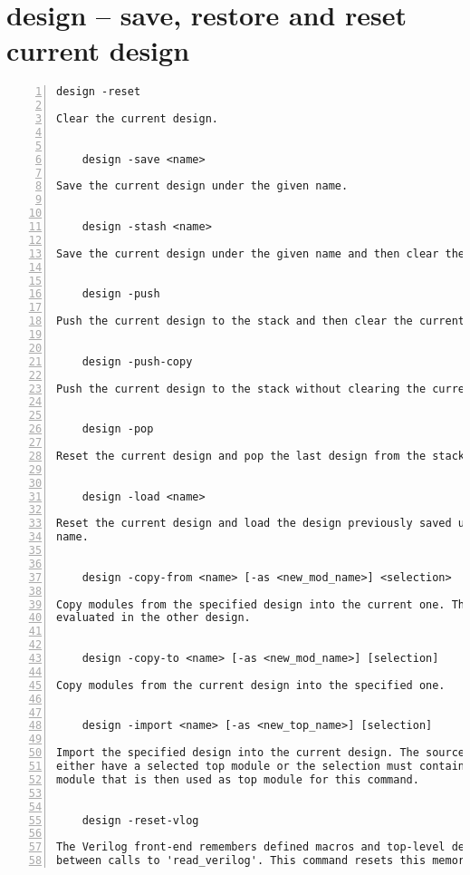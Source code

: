 \section{design -- save, restore and reset current design}
\label{cmd:design}
\begin{lstlisting}[numbers=left,frame=single]
    design -reset

Clear the current design.


    design -save <name>

Save the current design under the given name.


    design -stash <name>

Save the current design under the given name and then clear the current design.


    design -push

Push the current design to the stack and then clear the current design.


    design -push-copy

Push the current design to the stack without clearing the current design.


    design -pop

Reset the current design and pop the last design from the stack.


    design -load <name>

Reset the current design and load the design previously saved under the given
name.


    design -copy-from <name> [-as <new_mod_name>] <selection>

Copy modules from the specified design into the current one. The selection is
evaluated in the other design.


    design -copy-to <name> [-as <new_mod_name>] [selection]

Copy modules from the current design into the specified one.


    design -import <name> [-as <new_top_name>] [selection]

Import the specified design into the current design. The source design must
either have a selected top module or the selection must contain exactly one
module that is then used as top module for this command.


    design -reset-vlog

The Verilog front-end remembers defined macros and top-level declarations
between calls to 'read_verilog'. This command resets this memory.
\end{lstlisting}

